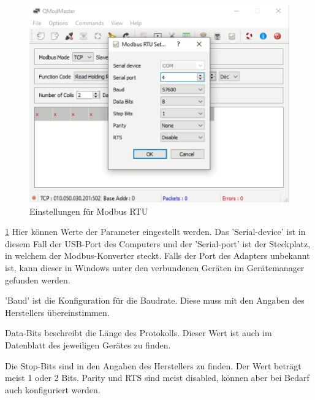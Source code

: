 \begin{figure}[h t]
\centering
\includegraphics[scale=0.7]{pics/Settingsforqmodmaster.png}
\caption{Einstellungen für Modbus RTU}
\label{fig:impl:Settingsforqmodmaster}
\end{figure}



\ref{fig:impl:Settingsforqmodmaster} Hier können Werte der Parameter eingestellt werden. Das 'Serial-device' ist in diesem Fall der USB-Port des Computers und der 'Serial-port' ist der Steckplatz, in welchem der Modbus-Konverter steckt. Falls der Port des Adapters unbekannt ist, kann dieser in Windows unter den verbundenen Geräten im Gerätemanager gefunden werden.



'Baud' ist die Konfiguration für die Baudrate. Diese muss mit den Angaben des Herstellers übereinstimmen.



Data-Bits beschreibt die Länge des Protokolls. Dieser Wert ist auch im Datenblatt des jeweiligen Gerätes zu finden.



Die Stop-Bits sind in den Angaben des Herstellers zu finden. Der Wert beträgt meist 1 oder 2 Bits. Parity und RTS sind meist disabled, können aber bei Bedarf auch konfiguriert werden.


